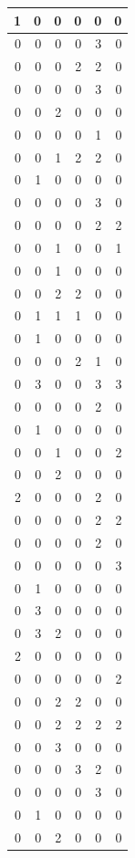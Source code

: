 \documentclass[
  12pt,
]{krantz}
\begin{document}
\begin{tabular}{r|r|r|r|r|r}
\hline
1 & 0 & 0 & 0 & 0 & 0\\
\hline
0 & 0 & 0 & 0 & 3 & 0\\
\hline
0 & 0 & 0 & 2 & 2 & 0\\
\hline
0 & 0 & 0 & 0 & 3 & 0\\
\hline
0 & 0 & 2 & 0 & 0 & 0\\
\hline
0 & 0 & 0 & 0 & 1 & 0\\
\hline
0 & 0 & 1 & 2 & 2 & 0\\
\hline
0 & 1 & 0 & 0 & 0 & 0\\
\hline
0 & 0 & 0 & 0 & 3 & 0\\
\hline
0 & 0 & 0 & 0 & 2 & 2\\
\hline
0 & 0 & 1 & 0 & 0 & 1\\
\hline
0 & 0 & 1 & 0 & 0 & 0\\
\hline
0 & 0 & 2 & 2 & 0 & 0\\
\hline
0 & 1 & 1 & 1 & 0 & 0\\
\hline
0 & 1 & 0 & 0 & 0 & 0\\
\hline
0 & 0 & 0 & 2 & 1 & 0\\
\hline
0 & 3 & 0 & 0 & 3 & 3\\
\hline
0 & 0 & 0 & 0 & 2 & 0\\
\hline
0 & 1 & 0 & 0 & 0 & 0\\
\hline
0 & 0 & 1 & 0 & 0 & 2\\
\hline
0 & 0 & 2 & 0 & 0 & 0\\
\hline
2 & 0 & 0 & 0 & 2 & 0\\
\hline
0 & 0 & 0 & 0 & 2 & 2\\
\hline
0 & 0 & 0 & 0 & 2 & 0\\
\hline
0 & 0 & 0 & 0 & 0 & 3\\
\hline
0 & 1 & 0 & 0 & 0 & 0\\
\hline
0 & 3 & 0 & 0 & 0 & 0\\
\hline
0 & 3 & 2 & 0 & 0 & 0\\
\hline
2 & 0 & 0 & 0 & 0 & 0\\
\hline
0 & 0 & 0 & 0 & 0 & 2\\
\hline
0 & 0 & 2 & 2 & 0 & 0\\
\hline
0 & 0 & 2 & 2 & 2 & 2\\
\hline
0 & 0 & 3 & 0 & 0 & 0\\
\hline
0 & 0 & 0 & 3 & 2 & 0\\
\hline
0 & 0 & 0 & 0 & 3 & 0\\
\hline
0 & 1 & 0 & 0 & 0 & 0\\
\hline
0 & 0 & 2 & 0 & 0 & 0\\

\end{tabular}
\end{document}
